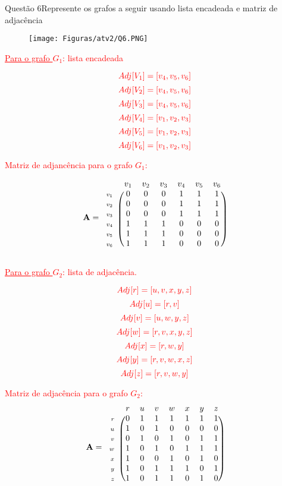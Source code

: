 \documentclass[12pt]{article}
\begin{document}
\begin{section}{Questão 6}{Represente os grafos a seguir usando lista encadeada e matriz de adjacência}\\

\begin{figure}[H]
    \centering
    \texttt{[image: Figuras/atv2/Q6.PNG]}
\end{figure}

\noindent \textcolor{red}{\underline{Para o grafo $G_1$}: lista encadeada}

$$ \textcolor{red}{Adj[V_1] = [v_4,v_5,v_6]}$$
$$ \textcolor{red}{Adj[V_2] = [v_4,v_5,v_6]}$$
$$ \textcolor{red}{Adj[V_3] = [v_4,v_5,v_6]}$$
$$ \textcolor{red}{Adj[V_4] = [v_1,v_2,v_3]}$$
$$ \textcolor{red}{Adj[V_5] = [v_1,v_2,v_3]}$$
$$ \textcolor{red}{Adj[V_6] = [v_1,v_2,v_3]}$$

\noindent \textcolor{red}{Matriz de adjancência para o grafo $G_1$:}

\[ \mathbf{A}= \begin{blockarray}{r*{6}{ >{\color{black}}c}}
& v_1 & v_2 & v_3 & v_4 & v_5 & v_6\\
\begin{block}{ >{\scriptstyle}r!{\,}(cccccc)}
v_1 & 0 & 0 & 0 & 1 & 1 & 1 \\
v_2 & 0 & 0 & 0 & 1 & 1 & 1 \\
v_3 & 0 & 0 & 0 & 1 & 1 & 1\\
v_4 & 1 & 1 & 1 & 0 & 0 & 0\\
v_5 & 1 & 1 & 1 & 0 & 0 & 0 \\
v_6 & 1 & 1 & 1 & 0 & 0 & 0 \\
\end{block}
\end{blockarray} \]

 \newpage
 
\noindent \textcolor{red}{\underline{Para o grafo $G_2$}: lista de adjacência.}
 
$$ \textcolor{red}{Adj[r] = [u,v,x,y,z]}$$
$$ \textcolor{red}{Adj[u] = [r,v]}$$
$$ \textcolor{red}{Adj[v] = [u,w,y,z]}$$
$$ \textcolor{red}{Adj[w] = [r,v,x,y,z]}$$
$$ \textcolor{red}{Adj[x] = [r,w,y]}$$
$$ \textcolor{red}{Adj[y] = [r,v,w,x,z]}$$
$$ \textcolor{red}{Adj[z] = [r,v,w,y]}$$

\noindent \textcolor{red}{Matriz de adjacência para o grafo $G_2$:}
\[ \mathbf{A}= \begin{blockarray}{r*{7}{ >{\color{black}}c}}
& r & u & v & w & x & y & z\\
\begin{block}{ >{\scriptstyle}r!{\,}(ccccccc)}
r & 0 & 1 & 1 & 1 & 1 & 1 & 1 \\
u & 1 & 0 & 1 & 0 & 0 & 0 & 0 \\
v & 0 & 1 & 0 & 1 & 0 & 1 & 1\\
w & 1 & 0 & 1 & 0 & 1 & 1 & 1\\
x & 1 & 0 & 0 & 1 & 0 & 1 & 0 \\
y & 1 & 0 & 1 & 1 & 1 & 0 & 1 \\
z & 1 & 0 & 1 & 1 & 0 & 1 & 0\\
\end{block}
\end{blockarray} \]

\end{section}
\end{document}
